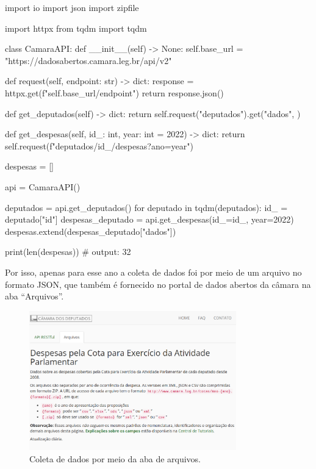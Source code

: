 \documentclass[12pt, a4paper]{article}
\begin{document}
\begin{python}
import io
import json
import zipfile

import httpx
from tqdm import tqdm

class CamaraAPI:
	def __init__(self) -> None:
		self.base_url = "https://dadosabertos.camara.leg.br/api/v2"
	
	def request(self, endpoint: str) -> dict:
		response = httpx.get(f"{self.base_url}/{endpoint}")
		return response.json()
	
	def get_deputados(self) -> dict:
		return self.request("deputados").get("dados", {})
	
	def get_despesas(self, id_: int, year: int = 2022) -> dict:
		return self.request(f"deputados/{id_}/despesas?ano={year}")

despesas = []

api = CamaraAPI()

deputados = api.get_deputados()
for deputado in tqdm(deputados):
	id_ = deputado["id"]
	despesas_deputado = api.get_despesas(id_=id_, year=2022)
	despesas.extend(despesas_deputado["dados"])

print(len(despesas))  # output: 32
\end{python}

Por isso, apenas para esse ano a coleta de dados foi por meio de um arquivo no formato JSON, que também é fornecido no portal de dados abertos da câmara na aba “Arquivos”.

\begin{figure}[!htbp]
    \centering
    \includegraphics[width=0.8\textwidth]{assets/1_arquivos.png}
    \caption{Coleta de dados por meio da aba de arquivos.}
    \label{fig:arquivo_json}
\end{figure}
\end{document}
